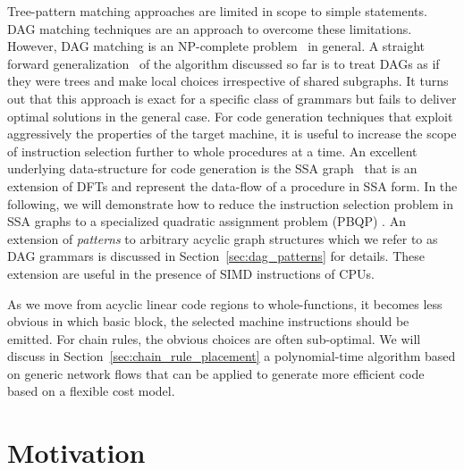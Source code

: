 Tree-pattern matching approaches are limited in scope to simple
statements. DAG matching techniques are an approach to overcome these
limitations. However, DAG matching is an NP-complete
problem~\cite{pro98least} in general. A straight forward
generalization~\cite{ertl99optimal} of the algorithm discussed so far
is to treat DAGs as if they were trees and make local choices
irrespective of shared subgraphs. It turns out that this approach is
exact for a specific class of grammars but fails to deliver optimal
solutions in the general case.  For code generation techniques that
exploit aggressively the properties of the target machine, it is
useful to increase the scope of instruction selection further to whole
procedures at a time. An excellent underlying data-structure for code
generation is the SSA graph~\cite{GSW95} that is an extension of DFTs
and represent the data-flow of a procedure in SSA form. In the
following, we will demonstrate how to reduce the instruction selection
problem in SSA graphs to a specialized quadratic assignment problem
(PBQP) \cite{EcksteinKS03}. An extension of \emph{patterns} to
arbitrary acyclic graph structures which we refer to as DAG grammars
is discussed in Section~\ref{sec:dag_patterns} for details. These
extension are useful in the presence of SIMD instructions of CPUs.

As we move from acyclic linear code regions to whole-functions, it
becomes less obvious in which basic block, the selected
machine instructions should be emitted. For chain rules, the obvious
choices are often sub-optimal. We will discuss in
Section~\ref{sec:chain_rule_placement} a polynomial-time algorithm
based on generic network flows that can be applied to generate more
efficient code based on a flexible cost model.

\section{Motivation}
\label{sec:motivation}

